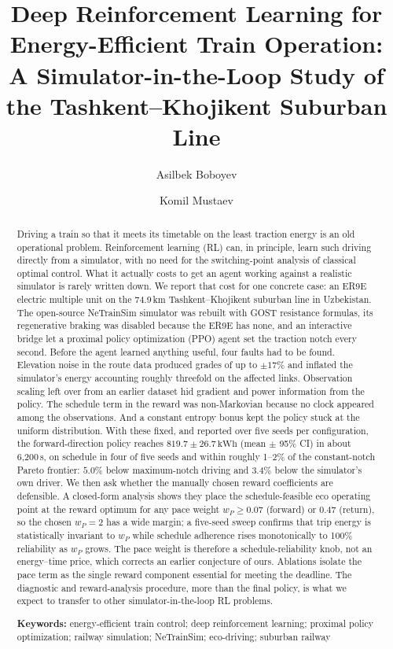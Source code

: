\documentclass[11pt,a4paper]{article}
\title{Deep Reinforcement Learning for Energy-Efficient Train Operation:\\
A Simulator-in-the-Loop Study of the Tashkent--Khojikent Suburban Line}
\author[1]{Asilbek Boboyev}
\author[1]{Komil Mustaev}
\affil[1]{Department of Software Engineering, School of Computing,\\
New Uzbekistan University, Tashkent, Uzbekistan\\
\texttt{\{a.boboev, k.mustaev\}@newuu.uz}}
\date{}
\newcommand{\kwh}{\,\text{kWh}}   %
\begin{document}
\maketitle

\begin{abstract}
Driving a train so that it meets its timetable on the least traction
energy is an old operational problem. Reinforcement learning (RL) can, in
principle, learn such driving directly from a simulator, with no need for
the switching-point analysis of classical optimal control. What it
actually costs to get an agent working against a realistic simulator is
rarely written down. We report that cost for one concrete case: an ER9E
electric multiple unit on the 74.9\,km Tashkent--Khojikent suburban line
in Uzbekistan. The open-source NeTrainSim simulator was rebuilt with GOST
resistance formulas, its regenerative braking was disabled because the
ER9E has none, and an interactive bridge let a proximal policy
optimization (PPO) agent set the traction notch every second. Before the
agent learned anything useful, four faults had to be found. Elevation
noise in the route data produced grades of up to $\pm17\%$ and inflated
the simulator's energy accounting roughly threefold on the affected
links. Observation scaling left over from an earlier dataset hid gradient
and power information from the policy. The schedule term in the reward
was non-Markovian because no clock appeared among the observations. And a
constant entropy bonus kept the policy stuck at the uniform distribution.
With these fixed, and reported over five seeds per configuration, the
forward-direction policy reaches $819.7\pm26.7\kwh$ (mean $\pm$ 95\% CI) in
about 6{,}200\,s, on schedule in four of five seeds and within roughly
1--2\% of the constant-notch Pareto frontier: $5.0\%$ below maximum-notch
driving and $3.4\%$ below the simulator's own driver. We then ask whether
the manually chosen reward coefficients are defensible. A closed-form
analysis shows they place the schedule-feasible eco operating point at the
reward optimum for any pace weight $w_P \ge 0.07$ (forward) or $0.47$
(return), so the chosen $w_P=2$ has a wide margin; a five-seed sweep
confirms that trip energy is statistically invariant to $w_P$ while
schedule adherence rises monotonically to 100\% reliability as $w_P$ grows.
The pace weight is therefore a schedule-reliability knob, not an
energy--time price, which corrects an earlier conjecture of ours.
Ablations isolate the pace term as the single reward component essential
for meeting the deadline. The diagnostic and reward-analysis procedure,
more than the final policy, is what we expect to transfer to other
simulator-in-the-loop RL problems.

\medskip
\noindent\textbf{Keywords:} energy-efficient train control; deep
reinforcement learning; proximal policy optimization; railway simulation;
NeTrainSim; eco-driving; suburban railway
\end{abstract}
\end{document}
